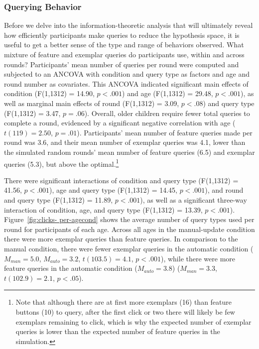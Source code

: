 \documentclass[10pt,letterpaper]{article}
\begin{document}
\subsubsection{Querying Behavior}

Before we delve into the information-theoretic analysis that will ultimately reveal how 
efficiently participants make queries to reduce the hypothesis space, it is useful to 
get a better sense of the type and range of behaviors observed. What mixture of 
feature and exemplar queries do participants use, within and across rounds? 
Participants' mean number of queries per round were computed and subjected to an 
ANCOVA with condition and query type as factors and age and round number as 
covariates. This ANCOVA indicated significant main effects of condition (F(1,1312) = 
14.90, $p<.001$) and age (F(1,1312) = 29.48, $p<.001$), as well as marginal main 
effects of round (F(1,1312) = 3.09, $p<.08$) and query type (F(1,1312) = 3.47, $p=.
06$). Overall, older children require fewer total queries to complete a round, 
evidenced by a significant negative correlation with age ($t(119) = 2.50$, $p=.01$). 
Participants' mean number of feature queries made per round was 3.6, and their 
mean number of exemplar queries was 4.1, lower than the simulated random 
rounds' mean number of feature queries (6.5) and exemplar queries (5.3), but above 
the optimal.\footnote{Note that although there are at first more exemplars (16) than 
feature buttons (10) to query, after the first click or two there will likely be few 
exemplars remaining to click, which is why the expected number of exemplar 
queries is lower than the expected number of feature queries in the simulation.} 

There were significant interactions of condition and query type (F(1,1312) = 41.56, 
$p<.001$), age and query type (F(1,1312) = 14.45, $p<.001$), and round and query 
type (F(1,1312) = 11.89, $p<.001$), as well as a significant three-way interaction of 
condition, age, and query type (F(1,1312) = 13.39, $p<.001$). Figure~\ref{fig:clicks-
per-agecond} shows the average number of query types used per round for 
participants of each age. Across all ages in the manual-update condition there were 
more exemplar queries than feature queries. In comparison to the manual condition, 
there were fewer exemplar queries in the automatic condition ($M_{man} = 5.0$, 
$M_{auto} = 3.2$, $t(103.5)=4.1$, $p<.001$), while there were more feature queries 
in the automatic condition ($M_{auto} = 3.8$) ($M_{man} = 3.3$, $t(102.9)=2.1$, 
$p<.05$). 
\end{document}
